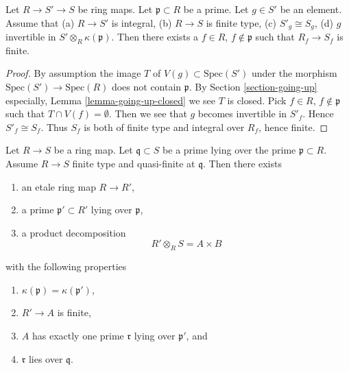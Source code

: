 \begin{lemma}
\label{lemma-produce-finite}
Let $R \to S' \to S$ be ring maps.
Let $\mathfrak p \subset R$ be a prime.
Let $g \in S'$ be an element.
Assume that (a) $R \to S'$ is integral, (b) $R \to S$ is finite type,
(c) $S'_g \cong S_g$, (d) $g$ invertible in
$S' \otimes_R \kappa(\mathfrak p)$.
Then there exists a $f \in R$, $f \not \in \mathfrak p$ such
that $R_f \to S_f$ is finite.
\end{lemma}

\begin{proof}
By assumption the image $T$ of $V(g) \subset \text{Spec}(S')$ under
the morphism $\text{Spec}(S') \to \text{Spec}(R)$ does not
contain $\mathfrak p$. By Section \ref{section-going-up}
especially, Lemma \ref{lemma-going-up-closed} we see $T$ is closed.
Pick $f \in R$, $f \not \in \mathfrak p$ such that
$T \cap V(f) = \emptyset$. Then we see that $g$ becomes invertible
in $S'_f$. Hence $S'_f \cong S_f$. Thus $S_f$ is both of finite type
and integral over $R_f$, hence finite.
\end{proof}

\begin{lemma}
\label{lemma-etale-makes-quasi-finite-finite-one-prime}
Let $R \to S$ be a ring map.
Let $\mathfrak q \subset S$ be a prime lying over
the prime $\mathfrak p \subset R$.
Assume $R \to S$ finite type and quasi-finite at $\mathfrak q$.
Then there exists
\begin{enumerate}
\item an etale ring map $R \to R'$,
\item a prime $\mathfrak p' \subset R'$ lying over $\mathfrak p$,
\item a product decomposition
$$
R' \otimes_R S = A \times B
$$
\end{enumerate}
with the following properties
\begin{enumerate}
\item $\kappa(\mathfrak p) = \kappa(\mathfrak p')$,
\item $R' \to A$ is finite,
\item $A$ has exactly one prime $\mathfrak r$ lying over $\mathfrak p'$, and
\item $\mathfrak r$ lies over $\mathfrak q$.
\end{enumerate}
\end{lemma}

